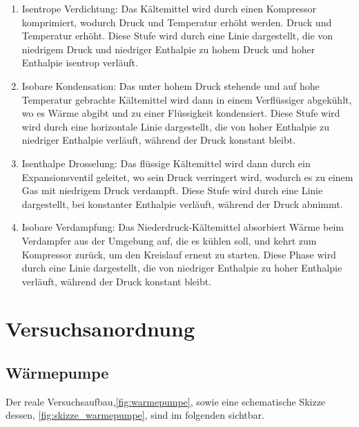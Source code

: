 \documentclass[12pt,english,ngerman]{scrartcl}
\begin{document}
\begin{enumerate}
	\item Isentrope Verdichtung: Das Kältemittel wird durch einen Kompressor komprimiert,
	      wodurch Druck und Temperatur erhöht werden. Druck und Temperatur erhöht. Diese
	      Stufe wird durch eine Linie dargestellt, die von niedrigem Druck und niedriger
	      Enthalpie zu hohem Druck und hoher Enthalpie isentrop verläuft.
	\item Isobare Kondensation: Das unter hohem Druck stehende und auf hohe Temperatur
	      gebrachte Kältemittel wird dann in einem Verflüssiger abgekühlt, wo es Wärme
	      abgibt und zu einer Flüssigkeit kondensiert. Diese Stufe wird wird durch eine
	      horizontale Linie dargestellt, die von hoher Enthalpie zu niedriger Enthalpie
	      verläuft, während der Druck konstant bleibt.
	\item Isenthalpe Drosselung: Das flüssige Kältemittel wird dann durch ein
	      Expansionsventil geleitet, wo sein Druck verringert wird, wodurch es zu einem
	      Gas mit niedrigem Druck verdampft. Diese Stufe wird durch eine Linie
	      dargestellt, bei konstanter Enthalpie verläuft, während der Druck abnimmt.
	\item Isobare Verdampfung: Das Niederdruck-Kältemittel absorbiert Wärme beim
	      Verdampfer aus der Umgebung auf, die es kühlen soll, und kehrt zum Kompressor
	      zurück, um den Kreislauf erneut zu starten. Diese Phase wird durch eine Linie
	      dargestellt, die von niedriger Enthalpie zu hoher Enthalpie verläuft, während
	      der Druck konstant bleibt.
\end{enumerate}

\section{Versuchsanordnung}\label{sec:versuchsanordnung}

\subsection{Wärmepumpe}

Der reale Versuchsaufbau,\autoref{fig:warmepumpe}, sowie eine schematische
Skizze dessen, \autoref{fig:skizze_warmepumpe}, sind im folgenden sichtbar.
\end{document}
